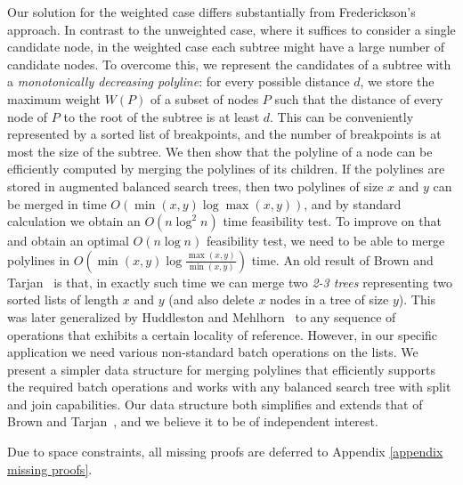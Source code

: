 \documentclass[a4paper,UKenglish]{lipics-v2016}
\theoremstyle{plain}
\newcommand{\Oh}{{O}}
\begin{document}
\vspace{0.04in} 
Our solution for the weighted case differs substantially from Frederickson's approach.
In contrast to the unweighted case, where it suffices to consider a single candidate node, in the weighted case each subtree might have a large number of candidate nodes. 
  To overcome this, we represent the candidates of a subtree with a {\em monotonically decreasing polyline}:
for every possible distance $d$, we store the maximum weight $W(P)$ of a subset of nodes $P$ such that the distance of every node of $P$ to the root of the subtree is at least $d$.
This can be conveniently represented by a sorted list of breakpoints, and the number of breakpoints is at most
the size of the subtree. We then show that the polyline of a node can be efficiently computed by merging the polylines of its children. If the polylines
are stored in augmented balanced search trees, then two polylines of size $x$ and $y$ can be merged in time $\Oh(\min(x,y)\log\max(x,y))$,
and by standard calculation we obtain an $\Oh(n\log^{2}n)$ time feasibility test. To improve on that and obtain an optimal $\Oh(n\log n)$ feasibility test,
we need to be able to merge polylines in $\Oh(\min(x,y)\log\frac{\max(x,y)}{\min(x,y)})$ time. 
An old result of Brown and Tarjan~\cite{Brown1980} is that, in exactly such time we can merge two {\em 2-3 trees} representing two sorted lists of length $x$ and $y$ (and also delete $x$ nodes in a tree of size $y$). This was later generalized by Huddleston and
Mehlhorn~\cite{huddlestonM82} to any sequence of operations that exhibits a certain locality of reference. However, in our specific
application we need various non-standard batch operations on the lists.
We present a simpler data structure for merging polylines that efficiently supports the required batch operations and works with %
any balanced search tree with split and join capabilities. Our data structure both simplifies and extends that of Brown and Tarjan~\cite{Brown1980}, and we believe it to be of independent interest. 

Due to space constraints, all  missing proofs are deferred to Appendix \ref{appendix missing proofs}.
\end{document}
